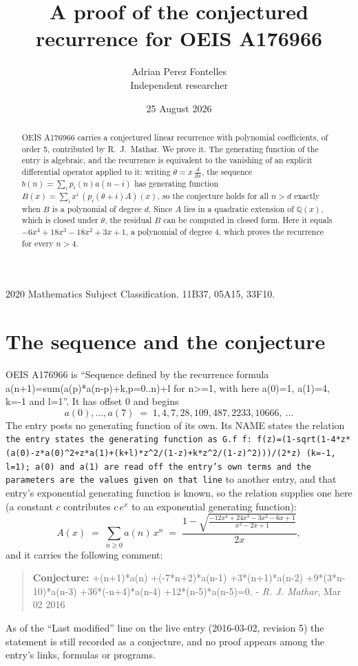 \documentclass[11pt,a4paper]{article}
\title{A proof of the conjectured recurrence for OEIS A176966}
\author{Adrian Perez Fontelles\\ \small Independent researcher}
\date{25 August 2026}
\theoremstyle{plain}
\theoremstyle{definition}
\begin{document}
\maketitle

\begin{abstract}
OEIS A176966 carries a conjectured linear recurrence with polynomial coefficients, of
order 5, contributed by R.~J.~Mathar. We prove it. The generating function of the
entry is algebraic, and the recurrence is equivalent to the vanishing of an explicit
differential operator applied to it: writing $\theta=x\,\frac{d}{dx}$, the sequence
$b(n)=\sum_{i}p_{i}(n)a(n-i)$ has generating function
$B(x)=\sum_{i}x^{i}\,(p_{i}(\theta+i)A)(x)$, so the conjecture holds for all $n>d$ exactly
when $B$ is a polynomial of degree $d$. Since $A$ lies in a quadratic extension of
$\mathbb{Q}(x)$, which is closed under $\theta$, the residual $B$ can be computed in
closed form. Here it equals $- 6 x^{4} + 18 x^{3} - 18 x^{2} + 3 x + 1$, a polynomial of degree $4$, which proves
the recurrence for every $n>4$.
\end{abstract}

\noindent\small 2020 Mathematics Subject Classification. 11B37, 05A15, 33F10.\normalsize

\section{The sequence and the conjecture}

OEIS A176966 is ``Sequence defined by the recurrence formula a(n+1)=sum(a(p)*a(n-p)+k,p=0..n)+l for n>=1, with here a(0)=1, a(1)=4, k=-1 and l=1''. It has offset $0$ and begins
\[
a(0),\dots,a(7)\;=\;1, 4, 7, 28, 109, 487, 2233, 10666,\ \dots
\]
The entry posts no generating function of its own. Its NAME states the
relation \texttt{the entry states the generating function as G.f f: f(z)=(1-sqrt(1-4*z*(a(0)-z*a(0)\textasciicircum{}2+z*a(1)+(k+l)*z\textasciicircum{}2/(1-z)+k*z\textasciicircum{}2/(1-z)\textasciicircum{}2)))/(2*z) (k=-1, l=1); a(0) and a(1) are read off the entry's own terms and the parameters are the values given on that line} to another entry, and that entry's exponential generating
function is known, so the relation supplies one here (a constant $c$ contributes
$c\,e^{x}$ to an exponential generating function):
\begin{equation}\label{eq:gf}
A(x)\;=\;\sum_{n\ge 0} a(n)\,x^{n}\;=\;\frac{1 - \sqrt{\frac{- 12 x^{4} + 24 x^{3} - 3 x^{2} - 6 x + 1}{x^{2} - 2 x + 1}}}{2 x} ,
\end{equation}
and it carries the following comment:
\begin{quote}\small
\textbf{Conjecture:} +(n+1)*a(n) +(-7*n+2)*a(n-1) +3*(n+1)*a(n-2) +9*(3*n-10)*a(n-3) +36*(-n+4)*a(n-4) +12*(n-5)*a(n-5)=0. - \emph{R. J. Mathar}, Mar 02 2016
\end{quote}
As of the ``Last modified'' line on the live entry (2016-03-02, revision 5) the
statement is still recorded as a conjecture, and no proof appears among the entry's links,
formulas or programs.
\end{document}
